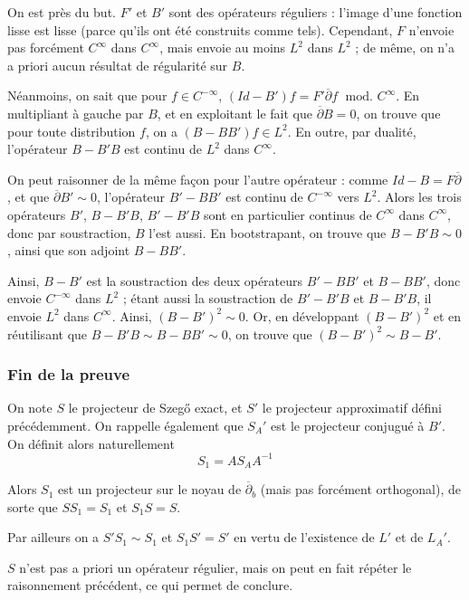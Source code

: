 On est près du but. $F'$ et $B'$ sont des opérateurs réguliers : l'image d'une fonction lisse est lisse (parce qu'ils ont été construits comme tels). Cependant, $F$ n'envoie pas forcément $C^{\infty}$ dans $C^{\infty}$, mais envoie au moins $L^2$ dans $L^2$ ; de même, on n'a a priori aucun résultat de régularité sur $B$.

Néanmoins, on sait que pour $f \in C^{-\infty}$, $(Id-B')f = F'\overline{\partial}f\; \text{ mod. } C^{\infty}$. En multipliant à gauche par $B$, et en exploitant le fait que $\overline{\partial}B=0$, on trouve que pour toute distribution $f$, on a $(B-BB')f \in L^2$. En outre, par dualité, l'opérateur $B-B'B$ est continu de $L^2$ dans $C^{\infty}$.

On peut raisonner de la même façon pour l'autre opérateur : comme $Id-B = F\overline{\partial}$, et que $\overline{\partial}B' \sim 0$, l'opérateur $B'-BB'$ est continu de $C^{-\infty}$ vers $L^2$. Alors les trois opérateurs $B'$, $B-B'B$, $B'-B'B$ sont en particulier continus de $C^{\infty}$ dans $C^{\infty}$, donc par soustraction, $B$ l'est aussi. En bootstrapant, on trouve que $B-B'B \sim 0$, ainsi que son adjoint $B-BB'$.

Ainsi, $B-B'$ est la soustraction des deux opérateurs $B'-BB'$ et $B-BB'$, donc envoie $C^{-\infty}$ dans $L^2$ ; étant aussi la soustraction de $B'-B'B$ et $B-B'B$, il envoie $L^2$ dans $C^{\infty}$. Ainsi, $(B-B')^2 \sim 0$. Or, en développant $(B-B')^2$ et en réutilisant que $B-B'B \sim B-BB' \sim 0$, on trouve que $(B-B')^2 \sim B-B'$.

\subsubsection{Fin de la preuve}

On note $S$ le projecteur de Szeg\H{o} exact, et $S'$ le projecteur approximatif défini précédemment. On rappelle également que $S_A'$ est le projecteur conjugué à $B'$. On définit alors naturellement 
\begin{equation*}
  S_1 = AS_AA^{-1}
\end{equation*}

Alors $S_1$ est un projecteur sur le noyau de $\overline{\partial}_b$ (mais pas forcément orthogonal), de sorte que $SS_1=S_1$ et $S_1S=S$.

Par ailleurs on a $S'S_1 \sim S_1$ et $S_1S'=S'$ en vertu de l'existence de $L'$ et de $L_A'$.

$S$ n'est pas a priori un opérateur régulier, mais on peut en fait répéter le raisonnement précédent, ce qui permet de conclure.

